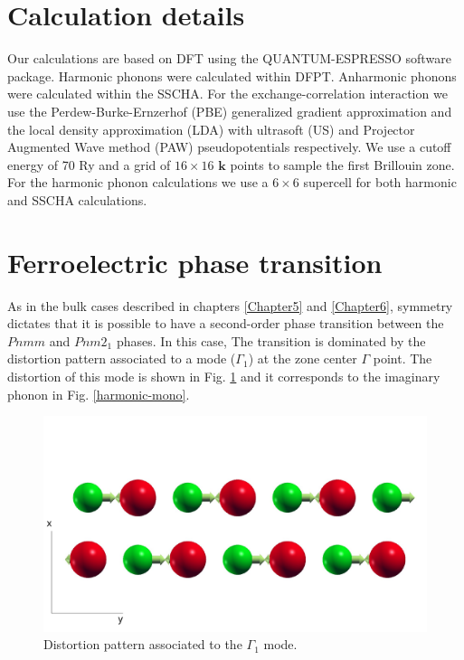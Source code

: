 \section{Calculation details}

Our calculations are based on DFT using the QUANTUM-ESPRESSO\cite{giannozzi2009quantum} software package. Harmonic 
phonons were calculated within DFPT. Anharmonic phonons were calculated within the SSCHA. For the 
exchange-correlation interaction we use the Perdew-Burke-Ernzerhof (PBE) generalized gradient approximation and the 
local density approximation (LDA) with ultrasoft (US) and Projector Augmented Wave method (PAW) pseudopotentials 
respectively. We use a cutoff energy of 70 Ry and a grid of $16\times16$ $\boldsymbol{k}$ points to sample the first 
Brillouin zone. For the harmonic phonon calculations we use a $6\times6$ supercell for both harmonic and SSCHA 
calculations.

\section{Ferroelectric phase transition}

As in the bulk cases described in chapters \ref{Chapter5} and \ref{Chapter6}, 
symmetry\cite{orobengoa2009amplimodes,perez2010mode} dictates that it is possible to have a second-order phase 
transition between the $Pnmm$ and $Pnm2_{1}$ phases. In this case, The transition is dominated by the distortion 
pattern associated to a mode ($\Gamma_{1}$) at the zone center $\Gamma$ point. The distortion of this 
mode is shown in Fig. \ref{transition-mono} and it corresponds to the imaginary phonon in 
Fig. \ref{harmonic-mono}. \\
\begin{figure}[h]
\includegraphics[width=\linewidth]{Figures/transition-mono.pdf}
	\caption{Distortion pattern associated to the $\Gamma_{1}$ mode.}
\label{transition-mono}
\end{figure}

